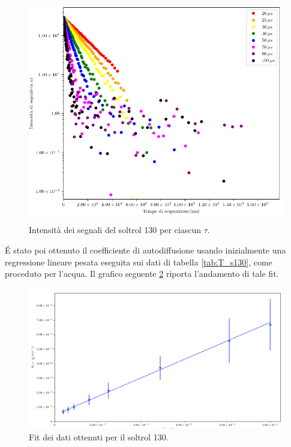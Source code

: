 \begin{figure}[h!]
\centering
\includegraphics[width=\columnwidth]{Figure/SOLTROL130_SigTSig.png}
\caption{Intensità dei segnali del soltrol 130 per ciascun $\tau$.}
\label{fig:S_s130}
\end{figure}
\newpage
\'E stato poi ottenuto il coefficiente di autodiffusione usando inizialmente una regressione lineare pesata eseguita sui dati di tabella \ref{tab:T_s130}, come proceduto per l'acqua.
Il grafico seguente \ref{fig:Df_s130} riporta l'andamento di tale fit.

\begin{figure}[h!]
\centering
\includegraphics[width=\columnwidth]{Figure/SOLTROL130_calc.png}
\caption{Fit dei dati ottenuti per il soltrol 130.}
\label{fig:Df_s130}
\end{figure}

